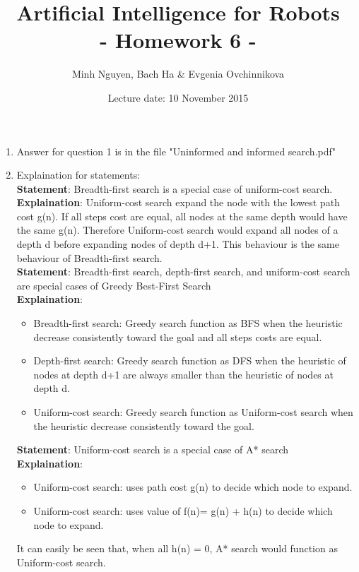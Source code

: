 \documentclass[a4paper, 12pt]{article}
\title{Artificial Intelligence for Robots \\
				- Homework 6 -}
\author{Minh Nguyen, Bach Ha \& Evgenia Ovchinnikova}
\date{Lecture date: 10 November 2015}
\begin{document}
\maketitle

    \begin{enumerate}

    \item Answer for question 1 is in the file "Uninformed and informed search.pdf"
    
    \item Explaination for statements:\vspace{0.5cm}\\
    \textbf{Statement}: Breadth-first search is a special case of uniform-cost search.\\
    \textbf{Explaination}: Uniform-cost search expand the node with the lowest path cost g(n). If all steps cost are equal, all nodes at the same depth would have the same g(n). Therefore Uniform-cost search would expand all nodes of a depth d before expanding nodes of depth d+1. This behaviour is the same behaviour of Breadth-first search.\\
	
	\textbf{Statement}: Breadth-first search, depth-first search, and uniform-cost search are special cases of Greedy Best-First Search\\
	\textbf{Explaination}:
	\begin{itemize}
		\item Breadth-first search: Greedy search function as BFS when the heuristic decrease consistently toward the goal and all steps costs are equal.
		\item Depth-first search: Greedy search function as DFS when the heuristic of nodes at depth d+1 are always smaller than the heuristic of nodes at depth d.
		\item Uniform-cost search: Greedy search function as Uniform-cost search when the heuristic decrease consistently toward the goal.
	\end{itemize}
	
	\vspace{0.5cm}
	\textbf{Statement}: Uniform-cost search is a special case of A* search\\
	\textbf{Explaination}: 
		\begin{itemize}
		\item Uniform-cost search: uses path cost g(n) to decide which node to expand.
		\item Uniform-cost search: uses value of f(n)= g(n) + h(n) to decide which node to expand.
		\end{itemize}
		It can easily be seen that, when all h(n) = 0, A* search would function as Uniform-cost search. 
		

\end{enumerate}
\end{document}
